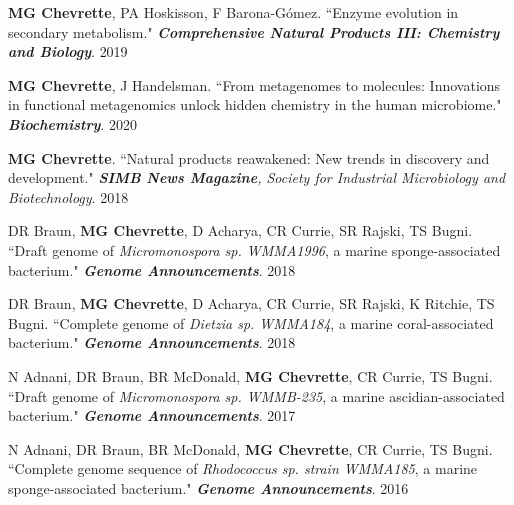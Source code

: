 
\begin{cvpubs}

\cvpub
{\textbf{MG Chevrette}, PA Hoskisson, F Barona-G\'{o}mez. ``Enzyme evolution in secondary metabolism." \textit{\textbf{Comprehensive Natural Products III: Chemistry and Biology}}. \textbf{\textit{}}}
{2019}

\end{cvpubs}


\begin{cvpubs}

\cvpub
{\textbf{MG Chevrette}, J Handelsman. ``From metagenomes to molecules: Innovations in functional metagenomics unlock hidden chemistry in the human microbiome." \textit{\textbf{Biochemistry}}.}
{2020}

\cvpub
{\textbf{MG Chevrette}. ``Natural products reawakened: New trends in discovery and development." \textit{\textbf{SIMB News Magazine}, Society for Industrial Microbiology and Biotechnology}. }
{2018}

\cvpub
{DR Braun, \textbf{MG Chevrette}, D Acharya, CR Currie, SR Rajski, TS Bugni. ``Draft genome of \textit{Micromonospora sp. WMMA1996}, a marine sponge-associated bacterium." \textit{\textbf{Genome Announcements}}. \textbf{\textit{}}}
{2018}

\cvpub
{DR Braun, \textbf{MG Chevrette}, D Acharya, CR Currie, SR Rajski, K Ritchie, TS Bugni. ``Complete genome of \textit{Dietzia sp. WMMA184}, a marine coral-associated bacterium." \textit{\textbf{Genome Announcements}}. \textbf{\textit{}}}
{2018}

\cvpub
{N Adnani, DR Braun, BR McDonald, \textbf{MG Chevrette}, CR Currie, TS Bugni. ``Draft genome of \textit{Micromonospora sp. WMMB-235}, a marine ascidian-associated bacterium." \textit{\textbf{Genome Announcements}}. \textbf{\textit{}}}
{2017}

\end{cvpubs} \begin{cvpubs}

\cvpub
{N Adnani, DR Braun, BR McDonald, \textbf{MG Chevrette}, CR Currie, TS Bugni. ``Complete genome sequence of \textit{Rhodococcus sp. strain WMMA185}, a marine sponge-associated bacterium." \textit{\textbf{Genome Announcements}}. \textbf{\textit{}}}
{2016}

\end{cvpubs}

